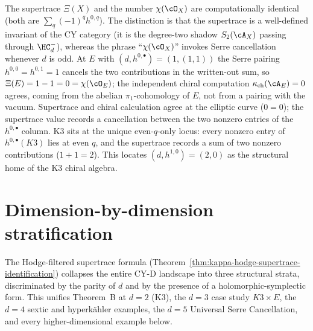 \begin{remark}[Why the identification \texorpdfstring{$\kappa_{\mathrm{ch}} =
\chi(\cO_X)$}{kappa-ch = chi(O-X)} survives only at \texorpdfstring{$(d, h^{1,0}) = (2, 0)$}{(d, h-1,0) = (2, 0)}]
\label{rem:why-only-k3}
The supertrace $\Xi(X)$ and the number $\chi(\cO_X)$ are
computationally identical (both are $\sum_q (-1)^q h^{0,q}$). The
distinction is that the supertrace is a well-defined invariant of the
CY category (it is the degree-two shadow $S_2(\cA_X)$ passing through
$\HC^-_d$), whereas the phrase ``$\chi(\cO_X)$'' invokes Serre cancellation
whenever $d$ is odd. At $E$ with $(d, h^{0,\bullet}) = (1, (1, 1))$ the
Serre pairing $h^{0,0} = h^{0,1} = 1$ cancels the two contributions in
the written-out sum, so $\Xi(E) = 1 - 1 = 0 = \chi(\cO_E)$; the
independent chiral computation $\kappa_{\mathrm{ch}}(\cA_E) = 0$ agrees,
coming from the abelian $\pi_1$-cohomology of $E$, not from a pairing
with the vacuum. Supertrace and chiral calculation agree at the elliptic curve ($0 = 0$);
the supertrace value records a cancellation between the two nonzero
entries of the $h^{0, \bullet}$ column. K3 sits at the unique
even-$q$-only locus: every nonzero entry of $h^{0, \bullet}(K3)$ lies
at even $q$, and the supertrace records a sum of two nonzero
contributions ($1 + 1 = 2$). This locates $(d, h^{1, 0}) = (2, 0)$
as the structural home of the K3 chiral algebra.
\end{remark}

\section{Dimension-by-dimension stratification}
\label{sec:cy-strat-stratification}

The Hodge-filtered supertrace formula
\textup{(}Theorem~\ref{thm:kappa-hodge-supertrace-identification}\textup{)}
collapses the entire CY-D landscape into three structural strata,
discriminated by the parity of $d$ and by the presence of a
holomorphic-symplectic form. This unifies Theorem~B at $d = 2$
\textup{(}K$3$\textup{),} the $d = 3$ case study
$K3 \times E$, the $d = 4$ sextic and hyperk\"ahler examples, the
$d = 5$ Universal Serre Cancellation, and every higher-dimensional
example below.

